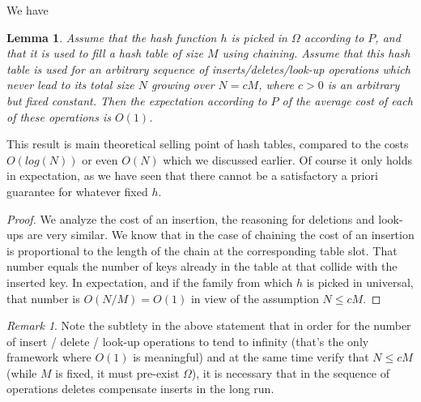 \documentclass[12pt]{article}
\theoremstyle{plain}
\newtheorem{lemma}{Lemma}
\theoremstyle{remark}
\newtheorem*{remark}{Remark}
\begin{document}
\medskip
We have

\begin{lemma}\label{lem:O1}
Assume that the hash function $h$ is picked in $\Omega$ according to
$P$, and that it is used to fill a hash table of size $M$ using chaining. 
Assume that this hash table is used for an arbitrary sequence of 
inserts/deletes/look-up operations which never lead to its total size 
$N$ growing over $N = cM$, where $c >0$ is an arbitrary but fixed
constant. Then the expectation according to $P$ of the average cost of 
each of these operations is $O(1)$. 
\end{lemma}

This result is main theoretical selling point of hash tables, compared to 
the costs $O(log(N))$ or even $O(N)$ which we discussed earlier. Of course
it only holds in expectation, as we have seen that there cannot be a
satisfactory a priori guarantee for whatever fixed $h$. 

\begin{proof}
We analyze the cost of an insertion, the reasoning for deletions and look-ups
are very similar. We know that in the case of chaining the cost of an insertion is
proportional to the length of the chain at the corresponding table slot. That number equals 
the number of keys already in the table at that collide with the inserted key.
In expectation, and if the family from which $h$ is picked in universal, that
number is $O(N/M) = O(1)$ in view of the assumption $N \leq cM.$  
\end{proof}

\begin{remark} Note the subtlety in the above statement that in order for the number of
insert / delete / look-up operations to tend to infinity (that's the only 
framework where $O(1)$ is meaningful) and at the same time verify that $N \leq cM$ 
(while $M$ is fixed, it must pre-exist $\Omega$), it is necessary that
in the sequence of operations deletes compensate inserts in the long run. 
\end{remark}
\end{document}
